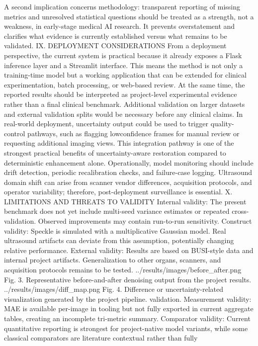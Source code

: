 A second implication concerns methodology: transparent reporting of missing metrics and unresolved statistical questions
should be treated as a strength, not a weakness, in early-stage
medical AI research. It prevents overstatement and clarifies
what evidence is currently established versus what remains to
be validated.
IX. DEPLOYMENT CONSIDERATIONS
From a deployment perspective, the current system is practical because it already exposes a Flask inference layer and
a Streamlit interface. This means the method is not only a
training-time model but a working application that can be
extended for clinical experimentation, batch processing, or
web-based review.
At the same time, the reported results should be interpreted
as project-level experimental evidence rather than a final
clinical benchmark. Additional validation on larger datasets
and external validation splits would be necessary before any
clinical claims.
In real-world deployment, uncertainty output could be used
to trigger quality-control pathways, such as flagging lowconfidence frames for manual review or requesting additional
imaging views. This integration pathway is one of the strongest
practical benefits of uncertainty-aware restoration compared to
deterministic enhancement alone.
Operationally, model monitoring should include drift detection, periodic recalibration checks, and failure-case logging. Ultrasound domain shift can arise from scanner vendor
differences, acquisition protocols, and operator variability;
therefore, post-deployment surveillance is essential.
X. LIMITATIONS AND THREATS TO VALIDITY
Internal validity: The present benchmark does not yet
include multi-seed variance estimates or repeated cross-
validation. Observed improvements may contain run-to-run
sensitivity.
Construct validity: Speckle is simulated with a multiplicative Gaussian model. Real ultrasound artifacts can deviate from
this assumption, potentially changing relative performance.
External validity: Results are based on BUSI-style data
and internal project artifacts. Generalization to other organs,
scanners, and acquisition protocols remains to be tested.
../results/images/before_after.png
Fig. 3. Representative before-and-after denoising output from the project
results.
../results/images/diff_map.png
Fig. 4. Difference or uncertainty-related visualization generated by the project
pipeline.
validation. Measurement validity: MAE is available per-image in
tooling but not fully exported in current aggregate tables,
creating an incomplete tri-metric summary.
Comparator validity: Current quantitative reporting is
strongest for project-native model variants, while some classical comparators are literature contextual rather than fully
